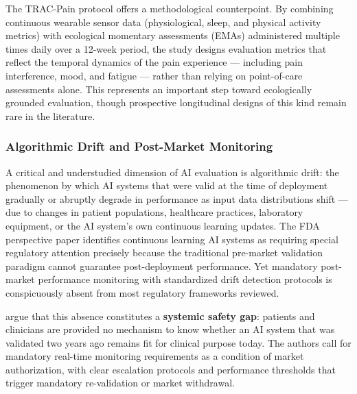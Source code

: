 The TRAC-Pain protocol \citep{bailes2026trac} offers a methodological
counterpoint. By combining continuous wearable sensor data (physiological,
sleep, and physical activity metrics) with ecological momentary assessments
(EMAs) administered multiple times daily over a 12-week period, the study
designs evaluation metrics that reflect the temporal dynamics of the pain
experience — including pain interference, mood, and fatigue — rather than
relying on point-of-care assessments alone. This represents an important
step toward ecologically grounded evaluation, though prospective longitudinal
designs of this kind remain rare in the literature.


\subsubsection{Algorithmic Drift and Post-Market Monitoring}
\label{sec:eval_drift}

A critical and understudied dimension of AI evaluation is algorithmic drift:
the phenomenon by which AI systems that were valid at the time of deployment
gradually or abruptly degrade in performance as input data distributions
shift — due to changes in patient populations, healthcare practices, laboratory
equipment, or the AI system's own continuous learning updates. The FDA
perspective paper \citep{warraich2024fda} identifies continuous learning AI
systems as requiring special regulatory attention precisely because the
traditional pre-market validation paradigm cannot guarantee post-deployment
performance. Yet mandatory post-market performance monitoring with standardized
drift detection protocols is conspicuously absent from most regulatory
frameworks reviewed.

\citet{abulibdeh2025illusion} argue that this absence constitutes a
\textbf{systemic safety gap}: patients and clinicians are provided no
mechanism to know whether an AI system that was validated two years ago
remains fit for clinical purpose today. The authors call for mandatory
real-time monitoring requirements as a condition of market authorization,
with clear escalation protocols and performance thresholds that trigger
mandatory re-validation or market withdrawal.


